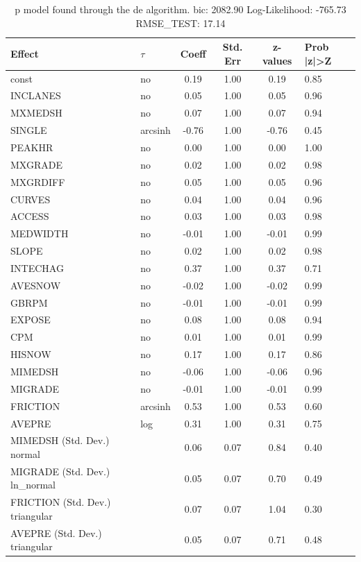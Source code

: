\begin{table}
	\caption{p model found through the de algorithm. bic: 2082.90 Log-Likelihood: -765.73 RMSE_TEST: 17.14}
	\begin{center}
		\begin{tabular}{|l|l|c|c|c|l|}
			\hline
			Effect & $\tau$ & Coeff & Std. Err & z-values & Prob |z|>Z \\
			\hline
			const & no & 0.19 & 1.00 & 0.19 & 0.85 \\
			\hline
			INCLANES & no & 0.05 & 1.00 & 0.05 & 0.96 \\
			\hline
			MXMEDSH & no & 0.07 & 1.00 & 0.07 & 0.94 \\
			\hline
			SINGLE & arcsinh & -0.76 & 1.00 & -0.76 & 0.45 \\
			\hline
			PEAKHR & no & 0.00 & 1.00 & 0.00 & 1.00 \\
			\hline
			MXGRADE & no & 0.02 & 1.00 & 0.02 & 0.98 \\
			\hline
			MXGRDIFF & no & 0.05 & 1.00 & 0.05 & 0.96 \\
			\hline
			CURVES & no & 0.04 & 1.00 & 0.04 & 0.96 \\
			\hline
			ACCESS & no & 0.03 & 1.00 & 0.03 & 0.98 \\
			\hline
			MEDWIDTH & no & -0.01 & 1.00 & -0.01 & 0.99 \\
			\hline
			SLOPE & no & 0.02 & 1.00 & 0.02 & 0.98 \\
			\hline
			INTECHAG & no & 0.37 & 1.00 & 0.37 & 0.71 \\
			\hline
			AVESNOW & no & -0.02 & 1.00 & -0.02 & 0.99 \\
			\hline
			GBRPM & no & -0.01 & 1.00 & -0.01 & 0.99 \\
			\hline
			EXPOSE & no & 0.08 & 1.00 & 0.08 & 0.94 \\
			\hline
			CPM & no & 0.01 & 1.00 & 0.01 & 0.99 \\
			\hline
			HISNOW & no & 0.17 & 1.00 & 0.17 & 0.86 \\
			\hline
			MIMEDSH & no & -0.06 & 1.00 & -0.06 & 0.96 \\
			\hline
			MIGRADE & no & -0.01 & 1.00 & -0.01 & 0.99 \\
			\hline
			FRICTION & arcsinh & 0.53 & 1.00 & 0.53 & 0.60 \\
			\hline
			AVEPRE & log & 0.31 & 1.00 & 0.31 & 0.75 \\
			\hline
			MIMEDSH (Std. Dev.) normal &  & 0.06 & 0.07 & 0.84 & 0.40 \\
			\hline
			MIGRADE (Std. Dev.) ln_normal &  & 0.05 & 0.07 & 0.70 & 0.49 \\
			\hline
			FRICTION (Std. Dev.) triangular &  & 0.07 & 0.07 & 1.04 & 0.30 \\
			\hline
			AVEPRE (Std. Dev.) triangular &  & 0.05 & 0.07 & 0.71 & 0.48 \\
			\hline
		\end{tabular}
	\end{center}
\end{table}